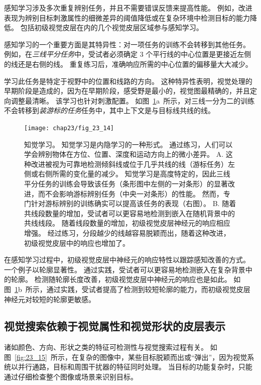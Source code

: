 感知学习涉及多次重复辨别任务，并且不需要错误反馈来提高性能。
例如，改进表现为辨别目标刺激属性的细微差异的阈值降低或在复杂环境中检测目标的能力降低。
包括初级视觉皮层在内的几个视觉皮层区域参与感知学习。


感知学习的一个重要方面是其特异性：对一项任务的训练不会转移到其他任务。
例如，在\textit{三线平分任务}中，受试者必须确定 3 个平行线的中心位置是更接近左侧的线还是右侧的线。
重复练习后，准确响应所需的中心位置的偏移量大大减少。


学习此任务是特定于视野中的位置和线路的方向。
这种特异性表明，视觉处理的早期阶段是造成的，因为在早期阶段，感受野是最小的，视觉图最精确的，并且定向调整最清晰。
该学习也针对刺激配置。
如图~\ref{fig:23_14}a~所示，对三线一分为二的训练不会转移到\textit{装游标的任务}任务中，其中上下文是与目标线共线的线。


\begin{figure}[htbp]
	\centering
	\texttt{[image: chap23/fig\_23\_14]}
	\caption{知觉学习。
		知觉学习是内隐学习的一种形式。
		通过练习，人们可以学会辨别物体在方位、位置、深度和运动方向上的微小差异。
		A. 这种改进被视为可靠地检测倾斜线或位于几乎共线的线（游标任务）左侧或右侧所需的变化量的减少。
		知觉学习是高度特定的，因此三线平分任务的训练会导致该任务（条形图中左侧的一对条形）的显著改进，而不会影响游标辨别任务（中央一对条形）的性能。
		然而，专门针对游标辨别的训练确实可以提高该任务的表现（右图）。
		B. 随着共线段数量的增加，受试者可以更容易地检测到嵌入在随机背景中的共线线段。
		随着线段数量的增加，初级视觉皮层神经元的响应相应增强。
		经过练习，分段越少的线越容易脱颖而出，随着这种改进，初级视觉皮层中的响应也增加了\cite{crist2001learning,li2008learning}。}
	\label{fig:23_14}
\end{figure}


在感知学习过程中，初级视觉皮层中神经元的响应特性以跟踪感知改善的方式。
一个例子以轮廓显著性。
通过实践，受试者可以更容易地检测嵌入在复杂背景中的轮廓。
检测随轮廓长度改善，初级视觉皮层中神经元的响应也是如此。
如图~\ref{fig:23_14}b~所示，通过实践，受试者提高了检测到较短轮廓的能力，而初级视觉皮层神经元对较短的轮廓更敏感。



\subsection{视觉搜索依赖于视觉属性和视觉形状的皮层表示}

诸如颜色、方向、形状之类的特征可检测性与视觉搜索过程有关。
如图~\ref{fig:23_15}~所示，在复杂的图像中，某些目标脱颖而出或“弹出”，因为视觉系统以并行通路，目标和周围干扰器的特征同时处理。
当目标的功能复杂时，只能通过仔细检查整个图像或场景来识别目标。


